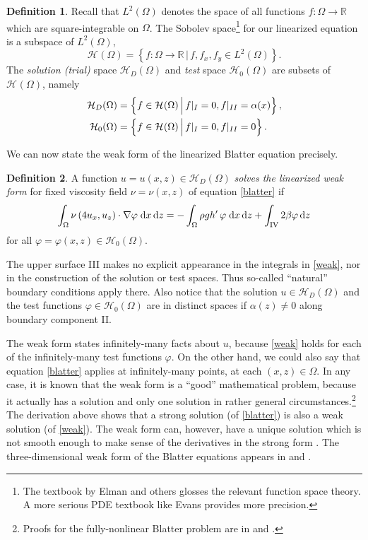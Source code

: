 \documentclass[11pt,final,reqno]{amsart}
\theoremstyle{remark}
\theoremstyle{definition}
\newtheorem*{defn}{Definition}
\newcommand{\RR}{\mathbb{R}}
\newcommand{\HoneX}[1]{\mathcal{H}_{#1}(\Omega)}
\newcommand{\Hone}{\HoneX{}}
\newcommand{\HoneD}{\HoneX{D}}
\newcommand{\Honezero}{\HoneX{0}}
\begin{document}
\begin{defn}  Recall that $L^2(\Omega)$ denotes the space of all functions $f : \Omega \to \RR$ which are square-integrable on $\Omega$.  The Sobolev space\footnote{The textbook by Elman and others \cite{Elmanetal2005} glosses the relevant function space theory.  A more serious PDE textbook like Evans \cite{Evans} provides more precision.} for our linearized equation is a subspace of  $L^2(\Omega)$,
	$$\Hone = \left\{f:\Omega \to \RR \,\Big|\, f,f_x,f_y \in L^2(\Omega)\right\}.$$
The \emph{solution (trial)} space $\HoneD$ and \emph{test} space $\Honezero$ are subsets of $\Hone$, namely
\begin{align}
     \HoneD &= \left\{f \in \Hone \,\Big|\, f|_{I} = 0, f|_{II} = \alpha(x)\right\}, \label{solntestspaces} \\
  \Honezero &= \left\{f \in \Hone \,\Big|\, f|_{I} = 0, f|_{II} = 0\right\}. \notag
\end{align}
\end{defn}

We can now state the weak form of the linearized Blatter equation precisely.

\begin{defn}
A function $u=u(x,z)\in\HoneD$ \emph{solves the linearized weak form} for fixed viscosity field $\nu=\nu(x,z)$ of equation \eqref{blatter} if
\begin{equation}
\int_\Omega \nu\, (4 u_x, u_z) \cdot \nabla \varphi \;\mathrm{d}x\,\mathrm{d}z = - \int_\Omega \rho g h'\,\varphi \;\mathrm{d}x\,\mathrm{d}z + \int_{\mathrm{IV}} 2 \beta \varphi \,\mathrm{d}z \label{weak}
\end{equation}
for all $\varphi=\varphi(x,z)\in\Honezero$.
\end{defn}

The upper surface III makes no explicit appearance in the integrals in \eqref{weak}, nor in the construction of the solution or test spaces.  Thus so-called ``natural'' boundary conditions apply there.  Also notice that the solution $u\in \HoneD$ and the test functions $\varphi \in \Honezero$ are in distinct spaces if $\alpha(z)\ne 0$ along boundary component II.

The weak form states infinitely-many facts about $u$, because \eqref{weak} holds for each of the infinitely-many test functions $\varphi$.  On the other hand, we could also say that equation \eqref{blatter} applies at infinitely-many points, at each $(x,z)\in \Omega$.  In any case, it is known that the weak form is a ``good'' mathematical problem, because it actually has a solution and only one solution in rather general circumstances.\footnote{Proofs for the fully-nonlinear Blatter problem are in \cite[theorem 2.1]{RappazReist05} and \cite[theorem 4.2]{SchoofCoulombBlatter}.}  The derivation above shows that a strong solution (of \eqref{blatter}) is also a weak solution (of \eqref{weak}).  The weak form can, however, have a unique solution which is not smooth enough to make sense of the derivatives in the strong form \cite{Evans}.  The three-dimensional weak form of the Blatter equations appears in \cite{BrownSmithAhmadia} and \cite{SchoofCoulombBlatter}.
\end{document}
